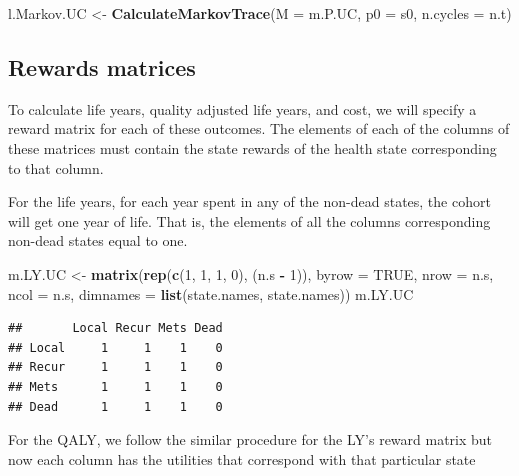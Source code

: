 \documentclass[]{article}
\newenvironment{Shaded}{\begin{snugshade}}{\end{snugshade}}
\newcommand{\KeywordTok}[1]{\textcolor[rgb]{0.13,0.29,0.53}{\textbf{#1}}}
\newcommand{\DataTypeTok}[1]{\textcolor[rgb]{0.13,0.29,0.53}{#1}}
\newcommand{\DecValTok}[1]{\textcolor[rgb]{0.00,0.00,0.81}{#1}}
\newcommand{\StringTok}[1]{\textcolor[rgb]{0.31,0.60,0.02}{#1}}
\newcommand{\OtherTok}[1]{\textcolor[rgb]{0.56,0.35,0.01}{#1}}
\newcommand{\OperatorTok}[1]{\textcolor[rgb]{0.81,0.36,0.00}{\textbf{#1}}}
\newcommand{\NormalTok}[1]{#1}
\theoremstyle{definition}
\theoremstyle{definition}
\theoremstyle{definition}
\theoremstyle{remark}
\begin{document}
\begin{Shaded}
\begin{Highlighting}[]
\NormalTok{l.Markov.UC <-}\StringTok{ }\KeywordTok{CalculateMarkovTrace}\NormalTok{(}\DataTypeTok{M =}\NormalTok{ m.P.UC, }\DataTypeTok{p0 =}\NormalTok{ s0, }\DataTypeTok{n.cycles =}\NormalTok{ n.t)}
\end{Highlighting}
\end{Shaded}

\subsection{Rewards matrices}\label{rewards-matrices}

To calculate life years, quality adjusted life years, and cost, we will
specify a reward matrix for each of these outcomes. The elements of each
of the columns of these matrices must contain the state rewards of the
health state corresponding to that column.

For the life years, for each year spent in any of the non-dead states,
the cohort will get one year of life. That is, the elements of all the
columns corresponding non-dead states equal to one.

\begin{Shaded}
\begin{Highlighting}[]
\NormalTok{m.LY.UC <-}\StringTok{ }\KeywordTok{matrix}\NormalTok{(}\KeywordTok{rep}\NormalTok{(}\KeywordTok{c}\NormalTok{(}\DecValTok{1}\NormalTok{, }\DecValTok{1}\NormalTok{, }\DecValTok{1}\NormalTok{, }\DecValTok{0}\NormalTok{), (n.s }\OperatorTok{-}\StringTok{ }\DecValTok{1}\NormalTok{)), }
                  \DataTypeTok{byrow =} \OtherTok{TRUE}\NormalTok{,}
                  \DataTypeTok{nrow =}\NormalTok{ n.s, }\DataTypeTok{ncol =}\NormalTok{ n.s, }
                  \DataTypeTok{dimnames =} \KeywordTok{list}\NormalTok{(state.names, state.names))}
\NormalTok{m.LY.UC}
\end{Highlighting}
\end{Shaded}

\begin{verbatim}
##       Local Recur Mets Dead
## Local     1     1    1    0
## Recur     1     1    1    0
## Mets      1     1    1    0
## Dead      1     1    1    0
\end{verbatim}

For the QALY, we follow the similar procedure for the LY's reward matrix
but now each column has the utilities that correspond with that
particular state
\end{document}
